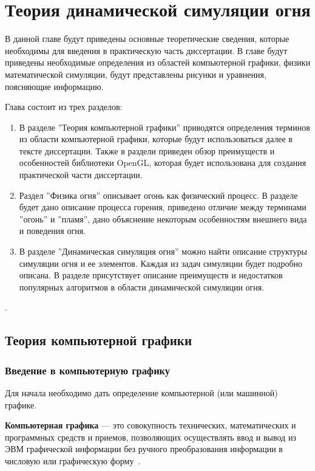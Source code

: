 \chapter{Теория динамической симуляции огня}

В данной главе будут приведены основные теоретические сведения, которые
необходимы для введения в практическую часть диссертации. В главе будут
приведены необходимые определения из областей компьютерной графики, физики
математической симуляции, будут представлены рисунки и уравнения, поясняющие
информацию.

Глава состоит из трех разделов:
\begin{enumerate}
    \item В разделе ''Теория компьютерной графики'' приводятся определения
        терминов из области компьютерной графики, которые будут использоваться
        далее в тексте диссертации. Также в раздели приведен обзор преимуществ и
        особенностей библиотеки OpenGL, которая будет использована для создания
        практической части диссертации.
    \item Раздел ''Физика огня'' описывает огонь как физический процесс. В
        разделе будет дано описание процесса горения, приведено отличие между
        терминами ''огонь'' и ''пламя'', дано объяснение некоторым особенностям
        внешнего вида и поведения огня.
    \item В разделе ''Динамическая симуляция огня'' можно найти описание\break{}
        структуры симуляции огня и ее элементов. Каждая из задач симуляции будет
        подробно описана. В разделе присутствует описание преимуществ и
        недостатков популярных алгоритмов в области динамической симуляции огня.
\end{enumerate}.

\section{Теория компьютерной графики}

\subsection{Введение в компьютерную графику}

Для начала необходимо дать определение компьютерной (или машинной) графике.

\textbf{Компьютерная графика} --- это совокупность технических, математических и
программных средств и приемов, позволяющих осуществлять ввод и вывод из ЭВМ
графической информации без ручного преобразования информации в числовую или
графическую форму~\cite{SamalGraphics}.

